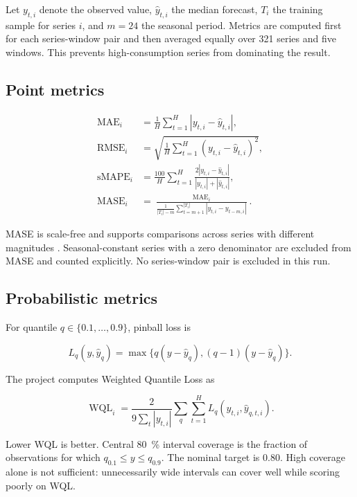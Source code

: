 \documentclass[11pt,a4paper]{article}
\begin{document}
Let $y_{t,i}$ denote the observed value, $\hat y_{t,i}$ the median forecast, $T_i$ the training
sample for series $i$, and $m=24$ the seasonal period. Metrics are computed first for each
series-window pair and then averaged equally over 321 series and five windows. This prevents
high-consumption series from dominating the result.

\subsection{Point metrics}

\begin{align}
\operatorname{MAE}_i &= \frac{1}{H}\sum_{t=1}^{H}|y_{t,i}-\hat y_{t,i}|,\\
\operatorname{RMSE}_i &= \sqrt{\frac{1}{H}\sum_{t=1}^{H}(y_{t,i}-\hat y_{t,i})^2},\\
\operatorname{sMAPE}_i &= \frac{100}{H}\sum_{t=1}^{H}
\frac{2|y_{t,i}-\hat y_{t,i}|}{|y_{t,i}|+|\hat y_{t,i}|},\\
\operatorname{MASE}_i &=
\frac{\operatorname{MAE}_i}
{\frac{1}{|T_i|-m}\sum_{t=m+1}^{|T_i|}|y_{t,i}-y_{t-m,i}|}.
\end{align}

MASE is scale-free and supports comparisons across series with different magnitudes
\cite{hyndman2006}. Seasonal-constant series with a zero denominator are excluded from MASE and
counted explicitly. No series-window pair is excluded in this run.

\subsection{Probabilistic metrics}

For quantile $q\in\{0.1,\ldots,0.9\}$, pinball loss is

\begin{equation}
L_q(y,\hat y_q)=\max\{q(y-\hat y_q),(q-1)(y-\hat y_q)\}.
\end{equation}

The project computes Weighted Quantile Loss as

\begin{equation}
\operatorname{WQL}_i =
\frac{2}{9\sum_t |y_{t,i}|}
\sum_{q}\sum_{t=1}^{H} L_q(y_{t,i},\hat y_{q,t,i}).
\end{equation}

Lower WQL is better. Central \SI{80}{\percent} interval coverage is the fraction of observations
for which $q_{0.1}\leq y\leq q_{0.9}$. The nominal target is 0.80. High coverage alone is not
sufficient: unnecessarily wide intervals can cover well while scoring poorly on WQL.
\end{document}
